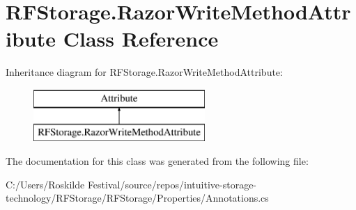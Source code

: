 \hypertarget{class_r_f_storage_1_1_razor_write_method_attribute}{}\section{R\+F\+Storage.\+Razor\+Write\+Method\+Attribute Class Reference}
\label{class_r_f_storage_1_1_razor_write_method_attribute}
Inheritance diagram for R\+F\+Storage.\+Razor\+Write\+Method\+Attribute\+:\begin{figure}[H]
\begin{center}
\leavevmode
\includegraphics[height=2.000000cm]{class_r_f_storage_1_1_razor_write_method_attribute}
\end{center}
\end{figure}


The documentation for this class was generated from the following file\+:\begin{DoxyCompactItemize}
\item 
C\+:/\+Users/\+Roskilde Festival/source/repos/intuitive-\/storage-\/technology/\+R\+F\+Storage/\+R\+F\+Storage/\+Properties/Annotations.\+cs\end{DoxyCompactItemize}
